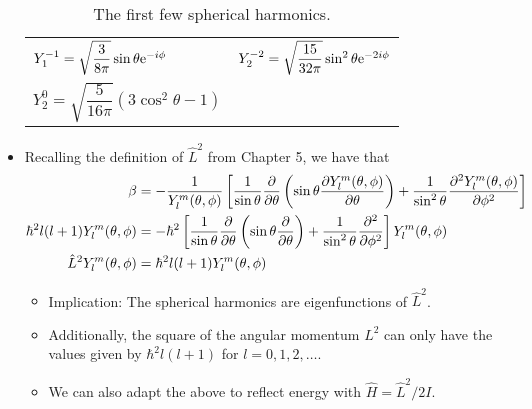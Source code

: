 \documentclass[../notes.tex]{subfiles}
\begin{document}
\begin{itemize}
\begin{table}[h!]
\begin{tabular}{ll}
            $Y_1^{-1}=\sqrt{\dfrac{3}{8\pi}}\sin\theta\e[-i\phi]$ & $Y_2^{-2}=\sqrt{\dfrac{15}{32\pi}}\sin^2\theta\e[-2i\phi]$\\
            $Y_2^0=\sqrt{\dfrac{5}{16\pi}}(3\cos^2\theta-1)$ & \\
            \bottomrule
        \end{tabular}
        \caption{The first few spherical harmonics.}
        \label{tab:sphericalHarmonics}
    \end{table}
    \item {}Recalling the definition of $\hat{L}^2$ from Chapter 5, we have that
    \begin{align*}
        \beta &= -\frac{1}{Y_l^m(\theta,\phi)}\left[ \frac{1}{\sin\theta}\pdv{\theta}\left( \sin\theta\pdv{Y_l^m(\theta,\phi)}{\theta} \right)+\frac{1}{\sin^2\theta}\pdv[2]{Y_l^m(\theta,\phi)}{\phi} \right]\\
        \hbar^2l(l+1)Y_l^m(\theta,\phi) &= -\hbar^2\left[ \frac{1}{\sin\theta}\pdv{\theta}\left( \sin\theta\pdv{\theta} \right)+\frac{1}{\sin^2\theta}\pdv[2]{\phi} \right]Y_l^m(\theta,\phi)\\
        \hat{L}^2Y_l^m(\theta,\phi) &= \hbar^2l(l+1)Y_l^m(\theta,\phi)
    \end{align*}
    \begin{itemize}
        \item Implication: The spherical harmonics are eigenfunctions of $\hat{L}^2$.
        \item Additionally, the square of the angular momentum $L^2$ can only have the values given by $\hbar^2l(l+1)$ for $l=0,1,2,\dots$.
        \item We can also adapt the above to reflect energy with $\hat{H}=\hat{L}^2/2I$.
    \end{itemize}
\end{itemize}
\end{document}
